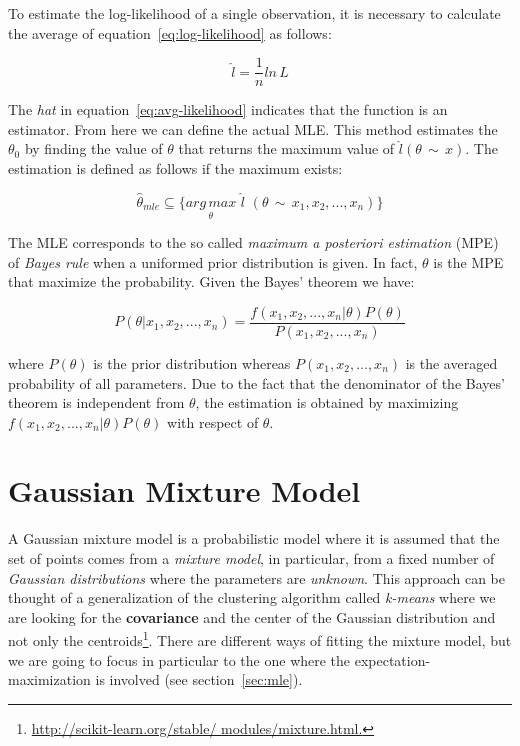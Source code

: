 \noindent To estimate the log-likelihood of a single observation, it is necessary to calculate the average of equation~\ref{eq:log-likelihood} as follows:

\begin{equation}
\label{eq:avg-likelihood}
	\hat{l} = \frac{1}{n} ln \, L
\end{equation}

\noindent The \textit{hat} in equation~\ref{eq:avg-likelihood} indicates that the function is an estimator. From here we can define the actual MLE.
This method estimates the $\theta_{0}$ by finding the value of $\theta$ that returns the maximum value of $\hat{l}(\theta \, \sim \, x)$. The estimation is defined as follows if the maximum exists:

\begin{equation}
	\hat{\theta}_{mle} \subseteq \{ \underset{\theta}{arg \, max} \,\, \hat{l} \,\, (\theta \, \sim \, x_{1}, x_{2}, ... , x_{n})\}
\end{equation}

\noindent The MLE corresponds to the so called \textit{maximum a posteriori estimation} (MPE) of \textit{Bayes rule} when a uniformed prior distribution is given. In fact, $\theta$ is the MPE that maximize the probability. Given the Bayes' theorem we have:

\begin{equation}
	P (\theta | x_{1}, x_{2}, ... , x_{n}) = \frac{f(x_{1}, x_{2}, ... , x_{n} | \theta) P(\theta)}{P(x_{1}, x_{2}, ... , x_{n})}
\end{equation}

\noindent where $P(\theta)$ is the prior distribution whereas $P(x_{1}, x_{2}, ... , x_{n})$ is the averaged probability of all parameters. Due to the fact that the denominator of the Bayes' theorem is independent from $\theta$, the estimation is obtained by maximizing $f(x_{1}, x_{2}, ... , x_{n} | \theta) P(\theta)$ with respect of $\theta$.


\section{Gaussian Mixture Model}
A Gaussian mixture model is a probabilistic model where it is assumed that the set of points comes from a \textit{mixture model}, in particular, from a fixed number of \textit{Gaussian distributions} where the parameters are \textit{unknown}. This approach can be thought of a generalization of the clustering algorithm called \textit{k-means} where we are looking for the \textbf{covariance} and the center of the Gaussian distribution and not only the centroids\footnote{\url{http://scikit-learn.org/stable/ modules/mixture.html.}}. There are different ways of fitting the mixture model, but we are going to focus in particular to the one where the expectation-maximization is involved (see section~\ref{sec:mle}). \\

